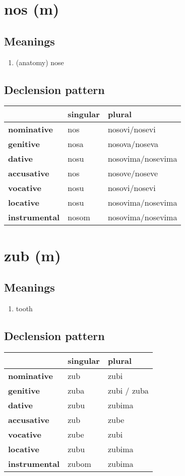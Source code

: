 \filbreak
\section{nos (m)}
\subsection*{Meanings}
\begin{enumerate}
\item (anatomy) nose
\end{enumerate}
\subsection*{Declension pattern}
\begin{tabularx}{\linewidth}{Xll}
\toprule
{} & singular &             plural \\
\midrule
\textbf{nominative  } &      nos &      nosovi/nosevi \\
\textbf{genitive    } &     nosa &      nosova/noseva \\
\textbf{dative      } &     nosu &  nosovima/nosevima \\
\textbf{accusative  } &      nos &      nosove/noseve \\
\textbf{vocative    } &     nosu &      nosovi/nosevi \\
\textbf{locative    } &     nosu &  nosovima/nosevima \\
\textbf{instrumental} &    nosom &  nosovima/nosevima \\
\bottomrule
\end{tabularx}

\filbreak
\section{zub (m)}
\subsection*{Meanings}
\begin{enumerate}
\item tooth
\end{enumerate}
\subsection*{Declension pattern}
\begin{tabularx}{\linewidth}{Xll}
\toprule
{} & singular &       plural \\
\midrule
\textbf{nominative  } &      zub &         zubi \\
\textbf{genitive    } &     zuba &  zubi / zuba \\
\textbf{dative      } &     zubu &       zubima \\
\textbf{accusative  } &      zub &         zube \\
\textbf{vocative    } &     zube &         zubi \\
\textbf{locative    } &     zubu &       zubima \\
\textbf{instrumental} &    zubom &       zubima \\
\bottomrule
\end{tabularx}

